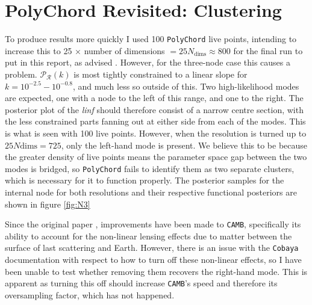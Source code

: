 \documentclass{article}
\begin{document}
\newpage

\section{PolyChord Revisited: Clustering}
\label{sec:polychord_revisited}

To produce results more quickly I used 100 \texttt{PolyChord} live points, intending to increase this to 25 $\times$ number of dimensions $= 25 N_\textrm{dims} \approx800$ for the final run to put in this report, as advised \cite{PolyChord_1, PolyChord_2, Sonke}. However, for the three-node case this causes a problem. $\mathcal P_\mathcal R(k)$ is most tightly constrained to a linear slope for $k = 10^{-2.5} - 10^{-0.8}$, and much less so outside of this. Two high-likelihood modes are expected, one with a node to the left of this range, and one to the right. The posterior plot of the \textit{linf} should therefore consist of a narrow centre section, with the less constrained parts fanning out at either side from each of the modes. This is what is seen with 100 live points. However, when the resolution is turned up to $25N\textrm{dims}=725$, only the left-hand mode is present. We believe this to be because the greater density of live points means the parameter space gap between the two modes is bridged, so \texttt{PolyChord} fails to identify them as two separate clusters, which is necessary for it to function properly. The posterior samples for the internal node for both resolutions and their respective functional posteriors are shown in figure \ref{fig:N3}

Since the original paper \cite{Handley2019}, improvements have been made to \texttt{CAMB}, specifically its ability to account for the non-linear lensing effects due to matter between the surface of last scattering and Earth. However, there is an issue with the \texttt{Cobaya} documentation with respect to how to turn off these non-linear effects, so I have been unable to test whether removing them recovers the right-hand mode. This is apparent as turning this off should increase \texttt{CAMB}'s speed and therefore its oversampling factor, which has not happened.
\end{document}
